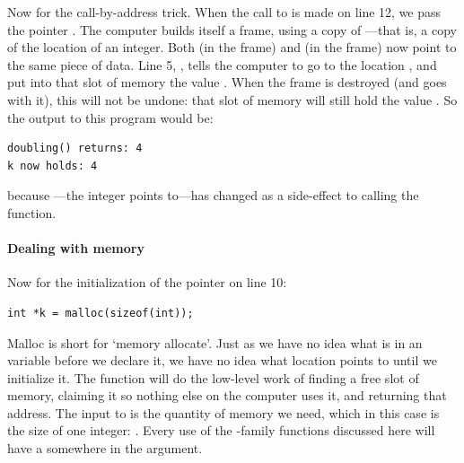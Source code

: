 Now for the call-by-address trick.  When the call to 
is made on line 12, we pass the pointer .
The computer builds itself a frame, using a copy of
---that is, a copy of the location of an integer. Both
 (in the  frame) and  (in the
 frame) now point to the same piece of data.  Line 5,
, tells the computer to go to the location
, and put into that slot of memory the value . When the frame is destroyed (and  goes with it),
this will not be undone: that slot of memory will still hold the value
.  So the output to this program would be: 
\begin{lstlisting}
doubling() returns: 4
k now holds: 4
\end{lstlisting}
because ---the integer  points to---has changed as a
side-effect to calling the  function.

\paragraph{Dealing with memory}  
 
Now for the initialization of the pointer on line 10:
\begin{lstlisting}
int *k = malloc(sizeof(int));
\end{lstlisting}
Malloc is short for `memory allocate'. Just as we have no idea what
is in an  variable before we declare it, we have no
idea what location  points to until we initialize it. The
function  will do the low-level work of finding
a free slot of memory, claiming it so nothing else on the computer
uses it, and returning that address. The input to  is the
quantity of memory we need, which in this case is the size of one
integer: . Every use of the -family
functions discussed here will have a  somewhere in the
argument.

\index{\&}

